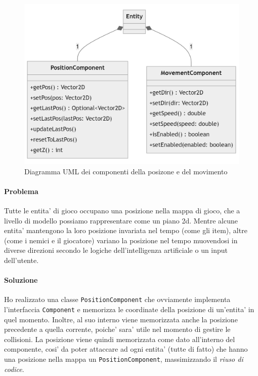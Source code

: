\documentclass[a4paper,12pt]{report}
\begin{document}
\begin{figure}[h]
	\centering
	\includegraphics[width=\textwidth]{uml/uml_pos_mov.png}
	\caption{Diagramma UML dei componenti della posizone e del movimento}
\end{figure}

\paragraph{Problema}
Tutte le entita' di gioco occupano una posizione nella mappa di gioco, che a livello di modello possiamo rappresentare come un piano 2d. Mentre alcune entita' mantengono la loro posizione invariata nel tempo (come gli item), altre (come i nemici e il giocatore) variano la posizione nel tempo muovendosi in diverse direzioni secondo le logiche dell'intelligenza artificiale o un input dell'utente.

\paragraph{Soluzione}
Ho realizzato una classe \texttt{PositionComponent} che ovviamente implementa l'interfaccia \texttt{Component} e memorizza le coordinate della posizione di un'entita' in quel momento. Inoltre, al suo interno viene memorizzata anche la posizione precedente a quella corrente, poiche' sara' utile nel momento di gestire le collisioni. La posizione viene quindi memorizzata come dato all'interno del componente, cosi' da poter attaccare ad ogni entita' (tutte di fatto) che hanno una posizione nella mappa un \texttt{PositionComponent}, massimizzando il \textit{riuso di codice}. 
\end{document}
